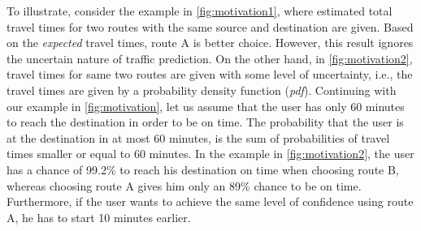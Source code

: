 % 
% 

To illustrate, consider the example in \cref{fig:motivation1}, where estimated total travel times for two routes with the same source and destination are given. Based on the \textit{expected} travel times, route A is better choice. However, this result ignores the uncertain nature of traffic prediction. On the other hand, in \cref{fig:motivation2}, travel times for same two routes are given with some level of uncertainty, i.e., the travel times are given by a probability density function (\textit{pdf}). Continuing with our example in \cref{fig:motivation}, let us assume that the user has only 60 minutes to reach the destination in order to be on time. The probability that the user is at the destination in at most 60 minutes, is the sum of probabilities of travel times smaller or equal to 60 minutes. In the example in \cref{fig:motivation2}, the user has a chance of 99.2\% to reach his destination on time when choosing route B, whereas choosing route A gives him only an 89\% chance to be on time. Furthermore, if the user wants to achieve the same level of confidence using route A, he has to start 10 minutes earlier.

